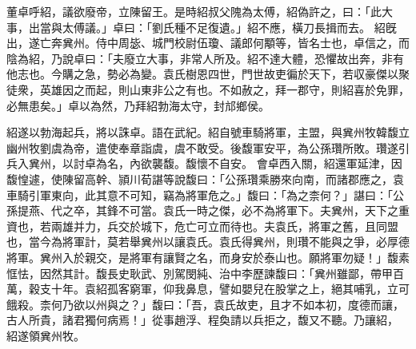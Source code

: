 \begin{pinyinscope}
 
董卓呼紹，議欲廢帝，立陳留王。是時紹叔父隗為太傅，紹偽許之，曰：「此大事，出當與太傅議。」卓曰：「劉氏種不足復遺。」紹不應，橫刀長揖而去。
 紹旣出，遂亡奔兾州。侍中周毖、城門校尉伍瓊、議郎何顒等，皆名士也，卓信之，而陰為紹，乃說卓曰：「夫廢立大事，非常人所及。紹不達大體，恐懼故出奔，非有他志也。今購之急，勢必為變。袁氏樹恩四世，門世故吏徧於天下，若収豪傑以聚徒衆，英雄因之而起，則山東非公之有也。不如赦之，拜一郡守，則紹喜於免罪，必無患矣。」卓以為然，乃拜紹勃海太守，封邟鄉侯。
 
 
紹遂以勃海起兵，將以誅卓。語在武紀。紹自號車騎將軍，主盟，與兾州牧韓馥立幽州牧劉虞為帝，遣使奉章詣虞，虞不敢受。後馥軍安平，為公孫瓚所敗。瓚遂引兵入兾州，以討卓為名，內欲襲馥。馥懷不自安。
 會卓西入關，紹還軍延津，因馥惶遽，使陳留高幹、頴川荀諶等說馥曰：「公孫瓚乘勝來向南，而諸郡應之，袁車騎引軍東向，此其意不可知，竊為將軍危之。」馥曰：「為之柰何？」諶曰：「公孫提燕、代之卒，其鋒不可當。袁氏一時之傑，必不為將軍下。夫兾州，天下之重資也，若兩雄并力，兵交於城下，危亡可立而待也。夫袁氏，將軍之舊，且同盟也，當今為將軍計，莫若舉兾州以讓袁氏。袁氏得兾州，則瓚不能與之爭，必厚德將軍。兾州入於親交，是將軍有讓賢之名，而身安於泰山也。願將軍勿疑！」馥素恇怯，因然其計。馥長史耿武、別駕閔純、治中李歷諫馥曰：「兾州雖鄙，帶甲百萬，穀支十年。袁紹孤客窮軍，仰我鼻息，譬如嬰兒在股掌之上，絕其哺乳，立可餓殺。柰何乃欲以州與之？」馥曰：「吾，袁氏故吏，且才不如本初，度德而讓，古人所貴，諸君獨何病焉！」從事趙浮、程奐請以兵拒之，馥又不聽。乃讓紹，
 紹遂領兾州牧。
 

\end{pinyinscope}
